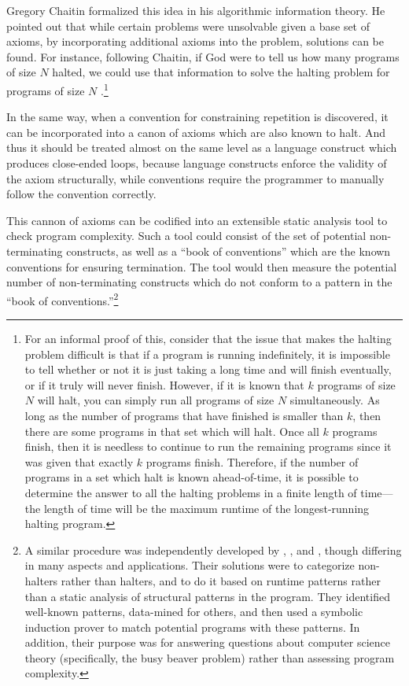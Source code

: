 Gregory Chaitin formalized this idea in his algorithmic information theory.  He pointed out that while certain problems were unsolvable given a base set of axioms, by incorporating additional axioms into the problem, solutions can be found.  For instance, following Chaitin, if God were to tell us how many programs of size $N$ halted, we could use that information to solve the halting problem for programs of size $N$ \citep{chaitin}.\footnote{For an informal proof of this, consider that the issue that makes the halting problem difficult is that if a program is running indefinitely, it is impossible to tell whether or not it is just taking a long time and will finish eventually, or if it truly will never finish.   However, if it is known that $k$ programs of size $N$ will halt, you can simply run all programs of size $N$ simultaneously.  As long as the number of programs that have finished is smaller than $k$, then there are some programs in that set which will halt.  Once all $k$ programs finish, then it is needless to continue to run the remaining programs since it was given that exactly $k$ programs finish.  Therefore, if the number of programs in a set which halt is known ahead-of-time, it is possible to determine the answer to all the halting problems in a finite length of time---the length of time will be the maximum runtime of the longest-running halting program.}

In the same way, when a convention for constraining repetition is discovered, it can be incorporated into a canon of axioms which are also known to halt.  And thus it should be treated almost on the same level as a language construct which produces close-ended loops, because language constructs enforce the validity of the axiom structurally, while conventions require the programmer to manually follow the convention correctly.

This cannon of axioms can be codified into an extensible static analysis tool to check program complexity.  Such a tool could consist of the set of potential non-terminating constructs, as well as a ``book of conventions'' which are the known conventions for ensuring termination.  The tool would then measure the potential number of non-terminating constructs which do not conform to a pattern in the ``book of conventions.''\footnote{A similar procedure was independently developed by \citet{bringsjord}, \citet{hertel}, and \citet{harland}, though differing in many aspects and applications.  Their solutions were to categorize non-halters rather than halters, and to do it based on runtime patterns rather than a static analysis of structural patterns in the program.  They identified well-known patterns, data-mined for others, and then used a symbolic induction prover to match potential programs with these patterns. In addition, their purpose was for answering questions about computer science theory (specifically, the busy beaver problem) rather than assessing program complexity.}


